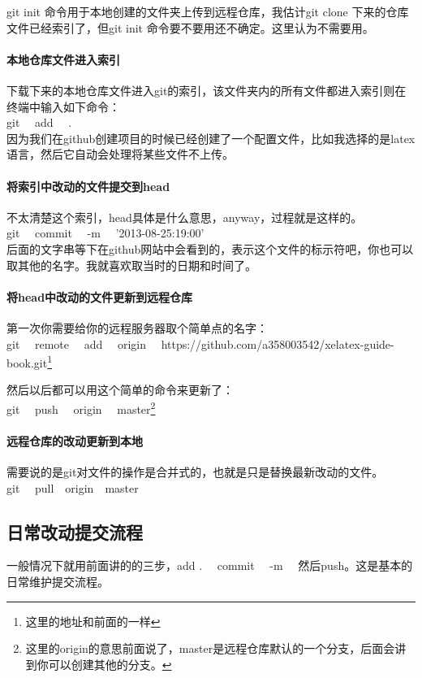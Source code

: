 git init 命令用于本地创建的文件夹上传到远程仓库，我估计git clone 下来的仓库文件已经索引了，但git init 命令要不要用还不确定。这里认为不需要用。
\paragraph{本地仓库文件进入索引}
下载下来的本地仓库文件进入git的索引，该文件夹内的所有文件都进入索引则在终端中输入如下命令：\\
git ~~add ~~.  \\
因为我们在github创建项目的时候已经创建了一个配置文件，比如我选择的是latex语言，然后它自动会处理将某些文件不上传。

\paragraph{将索引中改动的文件提交到head}
不太清楚这个索引，head具体是什么意思，anyway，过程就是这样的。\\
git ~~commit ~~-m ~~'2013-08-25:19:00' \\
后面的文字串等下在github网站中会看到的，表示这个文件的标示符吧，你也可以取其他的名字。我就喜欢取当时的日期和时间了。

\paragraph{将head中改动的文件更新到远程仓库}
第一次你需要给你的远程服务器取个简单点的名字：\\
git ~~remote ~~add ~~origin ~~https://github.com/a358003542/xelatex-guide-book.git\footnote{这里的地址和前面的一样}

然后以后都可以用这个简单的命令来更新了：\\
git~~ push~~ origin~~ master\footnote{这里的origin的意思前面说了，master是远程仓库默认的一个分支，后面会讲到你可以创建其他的分支。}

\paragraph{远程仓库的改动更新到本地}
需要说的是git对文件的操作是合并式的，也就是只是替换最新改动的文件。\\
git ~~pull~~origin~~master

\subsection{日常改动提交流程}
一般情况下就用前面讲的的三步，add .~~ commit ~~-m~~ 然后push。这是基本的日常维护提交流程。

